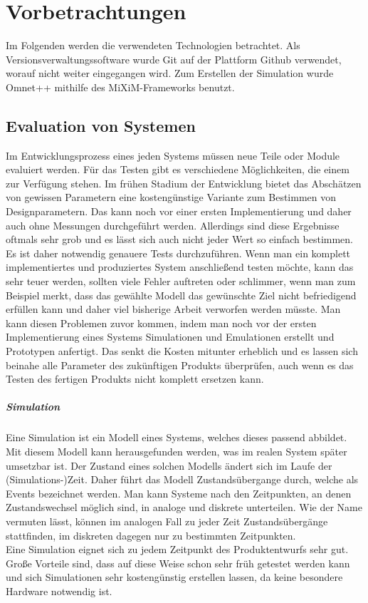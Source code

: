 \chapter{Vorbetrachtungen}

Im Folgenden werden die verwendeten Technologien betrachtet. Als Versionsverwaltungssoftware wurde Git\cite{git} auf der Plattform Github\cite{github} verwendet, worauf nicht weiter eingegangen wird. Zum Erstellen der Simulation wurde Omnet++\cite{omnet} mithilfe des MiXiM-Frameworks\cite{mixim} benutzt.

\section{Evaluation von Systemen}

Im Entwicklungsprozess eines jeden Systems müssen neue Teile oder Module evaluiert werden. Für das Testen gibt es verschiedene Möglichkeiten, die einem zur Verfügung stehen. Im frühen Stadium der Entwicklung bietet das Abschätzen von gewissen Parametern eine kostengünstige Variante zum Bestimmen von Designparametern. Das kann noch vor einer ersten Implementierung und daher auch ohne Messungen durchgeführt werden. Allerdings sind diese Ergebnisse oftmals sehr grob und es lässt sich auch nicht jeder Wert so einfach bestimmen. \newline
Es ist daher notwendig genauere Tests durchzuführen. Wenn man ein komplett implementiertes und produziertes System anschließend testen möchte, kann das sehr teuer werden, sollten viele Fehler auftreten oder schlimmer, wenn man zum Beispiel merkt, dass das gewählte Modell das gewünschte Ziel nicht befriedigend erfüllen kann und daher viel bisherige Arbeit verworfen werden müsste. \newline
Man kann diesen Problemen zuvor kommen, indem man noch vor der ersten Implementierung eines Systems Simulationen und Emulationen erstellt und Prototypen anfertigt. Das senkt die Kosten mitunter erheblich und es lassen sich beinahe alle Parameter des zukünftigen Produkts überprüfen, auch wenn es das Testen des fertigen Produkts nicht komplett ersetzen kann.

\paragraph{Simulation}

Eine Simulation ist ein Modell eines Systems, welches dieses passend abbildet. Mit diesem Modell kann herausgefunden werden, was im realen System später umsetzbar ist. Der Zustand eines solchen Modells ändert sich im Laufe der (Simulations-)Zeit. Daher führt das Modell Zustandsübergange durch, welche als Events bezeichnet werden. Man kann Systeme nach den Zeitpunkten, an denen Zustandswechsel möglich sind, in analoge und diskrete unterteilen. Wie der Name vermuten lässt, können im analogen Fall zu jeder Zeit Zustandsübergänge stattfinden, im diskreten dagegen nur zu bestimmten Zeitpunkten.\\
Eine Simulation eignet sich zu jedem Zeitpunkt des Produktentwurfs sehr gut. Große Vorteile sind, dass auf diese Weise schon sehr früh getestet werden kann und sich Simulationen sehr kostengünstig erstellen lassen, da keine besondere Hardware notwendig ist.

